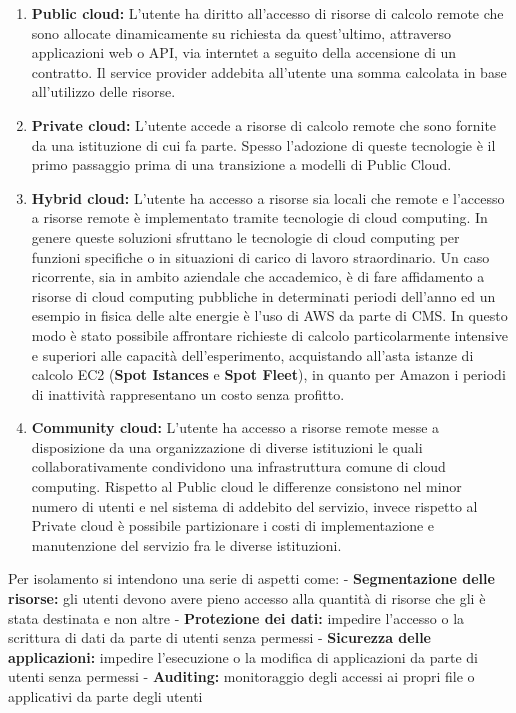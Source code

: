\begin{enumerate}
\def\labelenumi{\arabic{enumi}.}
\tightlist
\item
  \textbf{Public cloud:} L'utente ha diritto all'accesso di risorse di
  calcolo remote che sono allocate dinamicamente su richiesta da
  quest'ultimo, attraverso applicazioni web o API, via interntet a
  seguito della accensione di un contratto. Il service provider addebita
  all'utente una somma calcolata in base all'utilizzo delle risorse.
\item
  \textbf{Private cloud:} L'utente accede a risorse di calcolo remote
  che sono fornite da una istituzione di cui fa parte. Spesso l'adozione
  di queste tecnologie è il primo passaggio prima di una transizione a
  modelli di Public Cloud. 
\item
  \textbf{Hybrid cloud:} L'utente ha accesso a risorse sia locali che
  remote e l'accesso a risorse remote è implementato tramite tecnologie
  di cloud computing. In genere queste soluzioni sfruttano le tecnologie
  di cloud computing per funzioni specifiche o in situazioni di carico
  di lavoro straordinario. Un caso ricorrente, sia in ambito aziendale
  che accademico, è di fare affidamento a risorse di cloud computing
  pubbliche in determinati periodi dell'anno ed un esempio in fisica
  delle alte energie è l'uso di AWS da parte di CMS. In questo modo è
  stato possibile affrontare richieste di calcolo particolarmente
  intensive e superiori alle capacità dell'esperimento, acquistando
  all'asta istanze di calcolo EC2 (\textbf{Spot Istances} e \textbf{Spot
  Fleet}), in quanto per Amazon i periodi di inattività rappresentano un
  costo senza profitto.
\item
  \textbf{Community cloud:} L'utente ha accesso a risorse remote messe a
  disposizione da una organizzazione di diverse istituzioni le quali
  collaborativamente condividono una infrastruttura comune di cloud
  computing. Rispetto al Public cloud le differenze consistono nel minor
  numero di utenti e nel sistema di addebito del servizio, invece
  rispetto al Private cloud è possibile partizionare i costi di
  implementazione e manutenzione del servizio fra le diverse
  istituzioni.
\end{enumerate}

Per isolamento si intendono una serie di aspetti come: -
\textbf{Segmentazione delle risorse:} gli utenti devono avere pieno
accesso alla quantità di risorse che gli è stata destinata e non altre -
\textbf{Protezione dei dati:} impedire l'accesso o la scrittura di dati
da parte di utenti senza permessi - \textbf{Sicurezza delle
applicazioni:} impedire l'esecuzione o la modifica di applicazioni da
parte di utenti senza permessi - \textbf{Auditing:} monitoraggio degli
accessi ai propri file o applicativi da parte degli utenti


